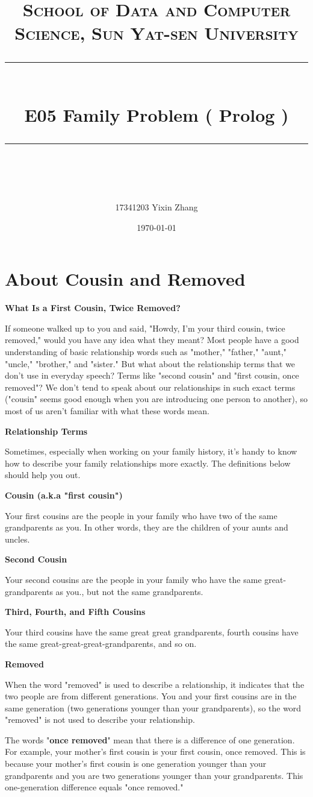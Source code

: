 ﻿\documentclass[a4paper, 11pt]{article}
\title{	
\normalfont \normalsize
\textsc{School of Data and Computer Science, Sun Yat-sen University} \\ [25pt] %
\rule{\textwidth}{0.5pt} \\[0.4cm] %
\huge  E05 Family Problem ( Prolog )\\ %
\rule{\textwidth}{2pt} \\[0.5cm] %
\author{17341203 Yixin Zhang}
\date{\normalsize\today}
}
\begin{document}
\maketitle
\tableofcontents
\newpage
\section{About Cousin and Removed}
\textbf{What Is a First Cousin, Twice Removed?}

If someone walked up to you and said, "Howdy, I'm your third cousin, twice removed," would you have any idea what they meant? Most people have a good understanding of basic relationship words such as "mother," "father," "aunt," "uncle," "brother," and "sister." But what about the relationship terms that we don't use in everyday speech? Terms like "second cousin" and "first cousin, once removed"? We don't tend to speak about our relationships in such exact terms ("cousin" seems good enough when you are introducing one person to another), so most of us aren't familiar with what these words mean.

\textbf{Relationship Terms}

Sometimes, especially when working on your family history, it's handy to know how to describe your family relationships more exactly. The definitions below should help you out.

\textbf{Cousin (a.k.a "first cousin")}

Your first cousins are the people in your family who have two of the same grandparents as you. In other words, they are the children of your aunts and uncles.

\textbf{Second Cousin}

Your second cousins are the people in your family who have the same great-grandparents as you., but not the same grandparents.

\textbf{Third, Fourth, and Fifth Cousins}

Your third cousins have the same great great grandparents, fourth cousins have the same great-great-great-grandparents, and so on.

\textbf{Removed}

When the word "removed" is used to describe a relationship, it indicates that the two people are from different generations. You and your first cousins are in the same generation (two generations younger than your grandparents), so the word "removed" is not used to describe your relationship.

The words "\textbf{once removed}" mean that there is a difference of one generation. For example, your mother's first cousin is your first cousin, once removed. This is because your mother's first cousin is one generation younger than your grandparents and you are two generations younger than your grandparents. This one-generation difference equals "once removed."
\end{document}
